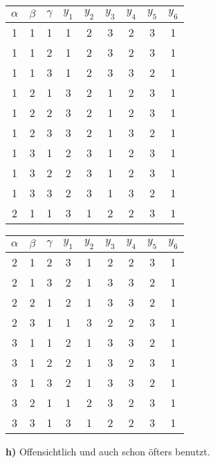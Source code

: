\documentclass[a4paper,graphics,11pt]{article}
\begin{document}
\begin{minipage}{.5\textwidth}
\begin{tabular}{*8{c|}c}
    $\alpha$ & $\beta$ & $\gamma$ & $y_1$ & $y_2$ & $y_3$ & $y_4$ & $y_5$ & $y_6$\\
    \hline
    1 & 1 & 1 & 1 & 2 & 3 & 2 & 3 & 1\\
    \hline
    1 & 1 & 2 & 1 & 2 & 3 & 2 & 3 & 1\\
    \hline
    1 & 1 & 3 & 1 & 2 & 3 & 3 & 2 & 1\\
    \hline
    1 & 2 & 1 & 3 & 2 & 1 & 2 & 3 & 1\\
    \hline
    1 & 2 & 2 & 3 & 2 & 1 & 2 & 3 & 1\\
    \hline
    1 & 2 & 3 & 3 & 2 & 1 & 3 & 2 & 1\\
    \hline
    1 & 3 & 1 & 2 & 3 & 1 & 2 & 3 & 1\\
    \hline
    1 & 3 & 2 & 2 & 3 & 1 & 2 & 3 & 1\\
    \hline
    1 & 3 & 3 & 2 & 3 & 1 & 3 & 2 & 1\\
    \hline
    2 & 1 & 1 & 3 & 1 & 2 & 2 & 3 & 1\\
\end{tabular}
\end{minipage}
\begin{minipage}{.5\textwidth}
\begin{tabular}{*8{c|}c}
    $\alpha$ & $\beta$ & $\gamma$ & $y_1$ & $y_2$ & $y_3$ & $y_4$ & $y_5$ & $y_6$\\
    \hline
    2 & 1 & 2 & 3 & 1 & 2 & 2 & 3 & 1\\
    \hline
    2 & 1 & 3 & 2 & 1 & 3 & 3 & 2 & 1\\
    \hline
    2 & 2 & 1 & 2 & 1 & 3 & 3 & 2 & 1\\
    \hline
    2 & 3 & 1 & 1 & 3 & 2 & 2 & 3 & 1\\
    \hline
    3 & 1 & 1 & 2 & 1 & 3 & 3 & 2 & 1\\
    \hline
    3 & 1 & 2 & 2 & 1 & 3 & 2 & 3 & 1\\
    \hline
    3 & 1 & 3 & 2 & 1 & 3 & 3 & 2 & 1\\
    \hline
    3 & 2 & 1 & 1 & 2 & 3 & 2 & 3 & 1\\
    \hline
    3 & 3 & 1 & 3 & 1 & 2 & 2 & 3 & 1\\
\end{tabular}
\end{minipage}


\textbf{h)}
Offensichtlich und auch schon öfters benutzt.
\end{document}
